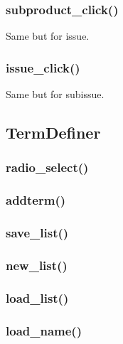 \documentclass{article}
\begin{document}
\subsubsection{subproduct_click()}
Same but for issue.

\subsubsection{issue_click()}
Same but for subissue.

\subsection{TermDefiner}

\subsubsection{radio_select()}


\subsubsection{addterm()}

\subsubsection{save_list()}

\subsubsection{new_list()}

\subsubsection{load_list()}

\subsubsection{load_name()}
\end{document}
